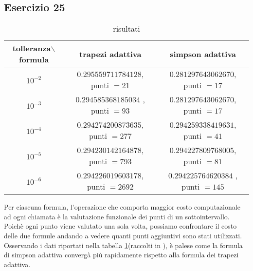 \subsection{Esercizio 25}


\begin{table}[h]
\begin{tabular}{|c |c |c|}
        \hline
        tolleranza$\backslash$formula & trapezi adattiva          &simpson adattiva\\
        \hline
        $10^{-2}$                     &$0.295559711784128$,  punti $= 21$      &$0.281297643062670$,  punti $= 17$  \\
        $10^{-3}$                     &$0.294585368185034$ , punti $= 93$     &$0.281297643062670$,  punti $= 17$  \\
        $10^{-4}$                     &$0.294274200873635$,  punti $= 277$      &$0.294259338419631$, punti $= 41$  \\
        $10^{-5}$                     &$0.294230142164878$, punti $= 793$      &$0.294227809768005$,  punti $= 81$  \\
        $10^{-6}$                     &$0.294226019603178$,  punti $= 2692$      &$0.294225764620384$ ,  punti $= 145$ \\
        \hline
    \end{tabular}
    \caption{risultati}
    \label{tab:25}
\end{table}
Per ciascuna formula, l'operazione che comporta maggior costo computazionale ad ogni chiamata è la valutazione funzionale dei punti di un sottointervallo.
Poichè ogni punto viene valutato una sola volta, possiamo confrontare il costo delle due formule andando a vedere quanti punti aggiuntivi sono stati utilizzati.
Osservando i dati riportati nella tabella \ref{tab:25}(raccolti in ), è palese come la formula di simpson adattiva convergà più rapidamente rispetto alla formula dei trapezi adattiva.
